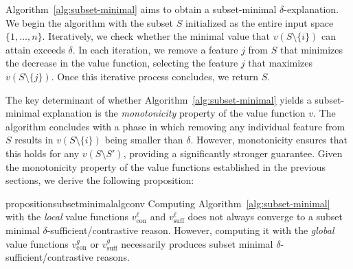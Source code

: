 \documentclass{article}
\begin{document}
Algorithm~\ref{alg:subset-minimal} aims to obtain a subset-minimal $\delta$-explanation. We begin the algorithm with the subset $S$ initialized as the entire input space $\{1,\ldots, n\}$. Iteratively, we check whether the minimal value that $v(S\setminus \{i\})$ can attain exceeds $\delta$. In each iteration, we remove a feature $j$ from $S$ that minimizes the decrease in the value function, selecting the feature $j$ that maximizes $v(S\setminus \{j\})$. Once this iterative process concludes, we return $S$.

The key determinant of whether Algorithm~\ref{alg:subset-minimal} yields a subset-minimal explanation is the \emph{monotonicity} property of the value function $v$. The algorithm concludes with a phase in which removing any individual feature from $S$ results in $v(S\setminus \{i\})$ being smaller than $\delta$. However, monotonicity ensures that this holds for any $v(S\setminus S')$, providing a significantly stronger guarantee. Given the monotonicity property of the value functions established in the previous sections, we derive the following proposition:












\begin{restatable}{proposition}{subsetminimalalgconv}\label{subset_minimal_alg_conv_prop}
    Computing Algorithm~\ref{alg:subset-minimal} with the \emph{local} value functions $v^{\ell}_{\text{con}}$ and $v^{\ell}_{\text{suff}}$ does not always converge to a subset minimal $\delta$-sufficient/contrastive reason. However, computing it with the \emph{global} value functions $v^{g}_{\text{con}}$ or $v^{g}_{\text{suff}}$ necessarily produces subset minimal $\delta$-sufficient/contrastive reasons. 
\end{restatable}
\end{document}
